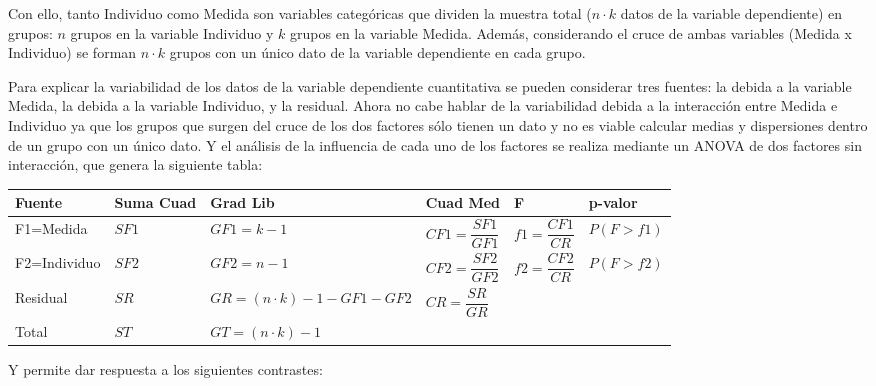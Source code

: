 \documentclass[
  spanish,
  a4paper,
]{scrreport}
\newcounter{none} %
\theoremstyle{plain}
\theoremstyle{definition}
\theoremstyle{definition}
\theoremstyle{remark}
\begin{document}
Con ello, tanto Individuo como Medida son variables categóricas que
dividen la muestra total (\(n\cdot k\) datos de la variable dependiente)
en grupos: \(n\) grupos en la variable Individuo y \(k\) grupos en la
variable Medida. Además, considerando el cruce de ambas variables
(Medida x Individuo) se forman \(n\cdot k\) grupos con un único dato de
la variable dependiente en cada grupo.

Para explicar la variabilidad de los datos de la variable dependiente
cuantitativa se pueden considerar tres fuentes: la debida a la variable
Medida, la debida a la variable Individuo, y la residual. Ahora no cabe
hablar de la variabilidad debida a la interacción entre Medida e
Individuo ya que los grupos que surgen del cruce de los dos factores
sólo tienen un dato y no es viable calcular medias y dispersiones dentro
de un grupo con un único dato. Y el análisis de la influencia de cada
uno de los factores se realiza mediante un ANOVA de dos factores sin
interacción, que genera la siguiente tabla:

{\def\LTcaptype{none} %
\begin{longtable}[]{@{}llllll@{}}
\toprule\noalign{}
Fuente & Suma Cuad & Grad Lib & Cuad Med & F & p-valor \\
\midrule\noalign{}
\endhead
\bottomrule\noalign{}
\endlastfoot
F1=Medida & \(SF1\) & \(GF1=k-1\) & \(CF1=\dfrac{SF1}{GF1}\) &
\(f1=\dfrac{CF1}{CR}\) & \(P(F>f1)\) \\
F2=Individuo & \(SF2\) & \(GF2=n-1\) & \(CF2=\dfrac{SF2}{GF2}\) &
\(f2=\dfrac{CF2}{CR}\) & \(P(F>f2)\) \\
Residual & \(SR\) & \(GR=(n \cdot k)-1-GF1-GF2\) & \(CR=\dfrac{SR}{GR}\)
& & \\
Total & \(ST\) & \(GT=(n\cdot k)-1\) & & & \\
\end{longtable}
}

Y permite dar respuesta a los siguientes contrastes:
\end{document}
